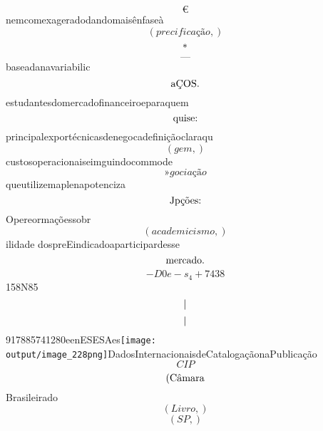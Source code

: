 \documentclass{article}
\begin{document}
\begin{equation}
€
\end{equation}nemcomexageradodandomaisênfaseà\begin{equation}
\left( precificação,\right)
\end{equation}\begin{equation}
$*$
\end{equation}\begin{equation}
—
\end{equation}baseadanavariabilic\begin{equation}
$aÇOS.$
\end{equation}estudantesdomercadofinanceiroeparaquem\begin{equation}
$quise:$
\end{equation}principalexportécnicasdenegocadefiniçãoclaraqu\begin{equation}
\left( gem,\right)
\end{equation}custosoperacionaiseimguindocommode\begin{equation}
»gociação
\end{equation}queutilizemaplenapotenciza\begin{equation}
$Jpções:$
\end{equation}Opereormaçõessobr\begin{equation}
\left( academicismo,\right)
\end{equation}ilidade dospreEindicadoaparticipardesse\begin{equation}
$mercado.$
\end{equation}\begin{equation}
- D0e - s_{4} + 7438
\end{equation}158N85\begin{equation}
$|$
\end{equation}\begin{equation}
$|$
\end{equation}917885741280eenESESAes\texttt{[image: output/image\_228png]}DadosInternacionaisdeCatalogaçãonaPublicação\begin{equation}
CIP
\end{equation}\begin{equation}
$(Câmara$
\end{equation}Brasileirado\begin{equation}
\left( Livro,\right)
\end{equation}\begin{equation}
\left( SP,\right)
\end{equation}\begin{equation}

\end{equation}
\end{document}
